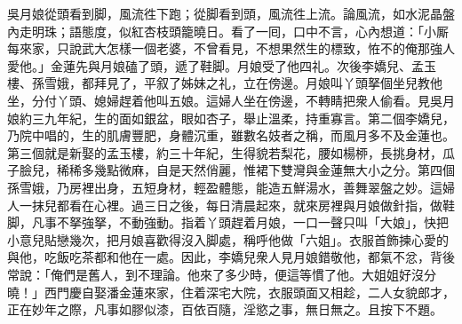 吳月娘從頭看到脚，風流徃下跑；從脚看到頭，風流徃上流。{}論風流，如水泥晶盤內走明珠；{}語態度，似紅杏枝頭籠曉日。看了一囘，口中不言，心內想道：「小厮每來家，只說武大怎樣一個老婆，不曾看見，不想果然生的標致，恠不的俺那強人愛他。」{}金蓮先與月娘磕了頭，遞了鞋脚。月娘受了他四礼。次後李嬌兒、孟玉樓、孫雪娥，都拜見了，平叙了姊妹之礼，立在傍邊。月娘叫丫頭拏個坐兒教他坐，分付丫頭、媳婦趕着他叫五娘。這婦人坐在傍邊，不轉睛把衆人偷看。見吳月娘約三九年紀，生的面如銀盆，眼如杏子，舉止溫柔，持重寡言。第二個李嬌兒，乃院中唱的，生的肌膚豐肥，身體沉重，雖數名妓者之稱，而風月多不及金蓮也。第三個就是新娶的孟玉樓，約三十年紀，生得貌若梨花，腰如楊桺，長挑身材，瓜子臉兒，稀稀多幾點微麻，自是天然俏麗，惟裙下雙灣與金蓮無大小之分。第四個孫雪娥，乃房裡出身，五短身材，輕盈體態，能造五鮮湯水，善舞翠盤之妙。這婦人一抹兒都看在心裡。過三日之後，每日清晨起來，就來房裡與月娘做針指，做鞋脚，凡事不拏強拏，不動強動。{}指着丫頭趕着月娘，一口一聲只叫「大娘」，快把小意兒貼戀幾次，把月娘喜歡得沒入脚處，稱呼他做「六姐」。衣服首飾揀心愛的與他，吃飯吃茶都和他在一處。{}因此，李嬌兒衆人見月娘錯敬他，都氣不忿，背後常說：「俺們是舊人，到不理論。他來了多少時，便這等慣了他。大姐姐好沒分曉！」西門慶自娶潘金蓮來家，住着深宅大院，衣服頭面又相趁，二人女貌郎才，正在妙年之際，凡事如膠似漆，百依百隨，淫慾之事，無日無之。且按下不題。

